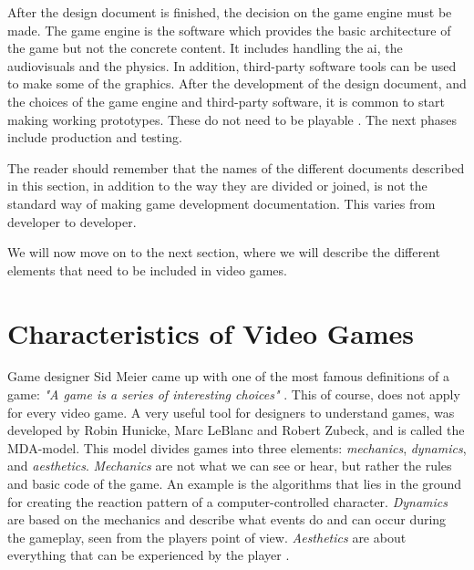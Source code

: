 After the design document is finished, the decision on the game engine must be made. The game engine is the software which provides the basic architecture of the game but not the concrete content. It includes handling the \ac{ai}, the audiovisuals and the physics. In addition, third-party software tools can be used to make some of the graphics. After the development of the design document, and the choices of the game engine and third-party software, it is common to start making working prototypes. These do not need to be playable \cite{understandingvg}. The next phases include production and testing. 

The reader should remember that the names of the different documents described in this section, in addition to the way they are divided or joined, is not the standard way of making game development documentation. This varies from developer to developer.

We will now move on to the next section, where we will describe the different elements that need to be included in video games.

\section{Characteristics of Video Games}

Game designer Sid Meier came up with one of the most famous definitions of a game: \emph{"A game is a series of interesting choices"} \cite{understandingvg}. This of course, does not apply for every video game. A very useful tool for designers to understand games, was developed by Robin Hunicke, Marc LeBlanc and Robert Zubeck, and is called the MDA-model. This model divides games into three elements: \emph{mechanics}, \emph{dynamics}, and \emph{aesthetics}. \emph{Mechanics} are not what we can see or hear, but rather the rules and basic code of the game. An example is the algorithms that lies in the ground for creating the reaction pattern of a computer-controlled character. \emph{Dynamics} are based on the mechanics and describe what events do and can occur during the gameplay, seen from the players point of view. \emph{Aesthetics} are about everything that can be experienced by the player \cite{understandingvg}. 

